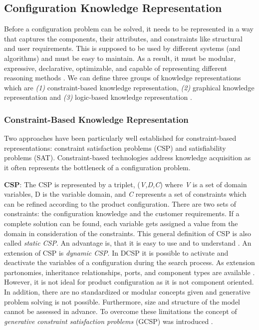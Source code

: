 \subsection{Configuration Knowledge Representation}
Before a configuration problem can be solved, it needs to be represented in a way that captures the components, their attributes, and constraints like structural and user requirements. This is supposed to be used by different systems (and algorithms) and must be easy to maintain. As a result, it must be modular, expressive, declarative, optimizable, and capable of representing different reasoning methods \cite{mailharro98a}. We can define three groups of knowledge representations which are \textit{(1)} constraint-based knowledge representation, \textit{(2)} graphical knowledge representation and \textit{(3)} logic-based knowledge representation \cite{hofestrybawo14a}.

\subsubsection{Constraint-Based Knowledge Representation}
Two approaches have been particularly well established for constraint-based representations: constraint satisfaction problems (CSP) and satisfiability problems (SAT). Constraint-based technologies address knowledge acquisition as it often represents the bottleneck of a configuration problem. \newline

\textbf{CSP}: The CSP is represented by a triplet, (\textit{V,D,C}) where \textit{V} is a set of domain variables, D is the variable domain, and \textit{C} represents a set of constraints which can be refined according to the product configuration. There are two sets of constraints: the configuration knowledge and the customer requirements. If a complete solution can be found, each variable gets assigned a value from the domain in consideration of the constraints. This general definition of CSP is also called \textit{static CSP}. An advantage is, that it is easy to use and to understand \cite{hofestrybawo14a, dhfahata17a}. An extension of CSP is \textit{dynamic CSP}. In DCSP it is possible to activate and deactivate the variables of a configuration during the search process. As extension partonomies, inheritance relationships, ports, and component types are available \cite{mitfal90}. However, it is not ideal for product configuration as it is not component oriented. In addition, there are no standardized or modular concepts given and generative problem solving is not possible. Furthermore, size and structure of the model cannot be assessed in advance. To overcome these limitations the concept of \textit{generative constraint satisfaction problems} (GCSP) was introduced \cite{stfrha98, hofestrybawo14a}.  \newline


